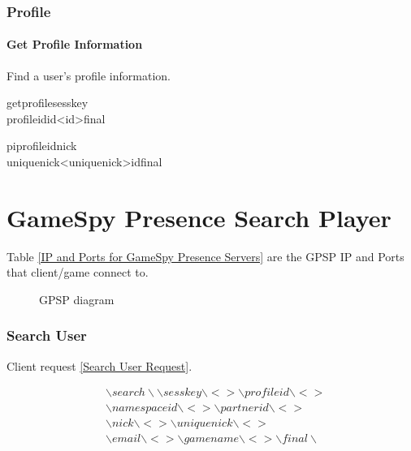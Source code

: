 \documentclass[oneside,titlepage,a4paper]{Definition/retrospy} %
\begin{document}
\subsection{Profile}
\subsubsection{Get Profile Information}
Find a user's profile information.
\ClientRequest

\begin{mybox}
	\tbs getprofile\tbs\tbs sesskey\tbs <session key>\\
	\tbs profileid\tbs <profile id>\tbs id\tbs <id>\tbs final\tbs
\end{mybox}
\ServerResponse

\begin{mybox}
	\tbs pi\tbs\tbs profileid\tbs <profile id>\tbs nick\tbs <nick name>\\\tbs uniquenick\tbs <uniquenick>\tbs id\tbs <operation id>\tbs final\tbs
\end{mybox}




\chapter{GameSpy Presence Search Player}
Table \ref{IP and Ports for GameSpy Presence Servers} are the GPSP IP and Ports that client/game connect to.

\begin{figure}[H]
	\centering
	\caption{GPSP diagram}
	\label{GPSP diagram}
\end{figure}

\subsection{Search User}
Client request \ref{Search User Request}.

\begin{tcolorbox}
	\begin{equation}\label{Search User Request}
	\begin{split}
	&\backslash search\backslash\backslash sesskey \backslash < >\backslash profileid \backslash < > \\ &\backslash namespaceid\backslash < >  \backslash partnerid\backslash < >\\
	& \backslash nick \backslash < > \backslash uniquenick \backslash < > \\ 
	&\backslash email \backslash < > \backslash gamename \backslash < > \backslash final \backslash
	\end{split}
	\end{equation}
\end{tcolorbox}
\end{document}

